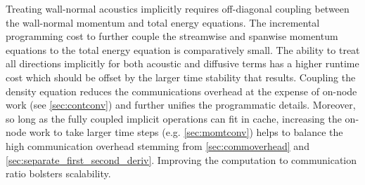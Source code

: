 \documentclass[letterpaper,11pt,nointlimits,reqno,draft]{amsbook}
\begin{document}
Treating wall-normal acoustics implicitly requires off-diagonal coupling
between the wall-normal momentum and total energy equations.  The incremental
programming cost to further couple the streamwise and spanwise momentum
equations to the total energy equation is comparatively small.  The ability to
treat all directions implicitly for both acoustic and diffusive terms has a
higher runtime cost which should be offset by the larger time stability that
results.  Coupling the density equation reduces the communications overhead at
the expense of on-node work (see \autoref{sec:contconv}) and further
unifies the programmatic details.  Moreover, so long as the fully coupled
implicit operations can fit in cache, increasing the on-node work to take
larger time steps (e.g. \autoref{sec:momtconv}) helps to balance the high
communication overhead stemming from \autoref{sec:commoverhead}
and \autoref{sec:separate_first_second_deriv}.  Improving the computation to
communication ratio bolsters scalability.
\end{document}
